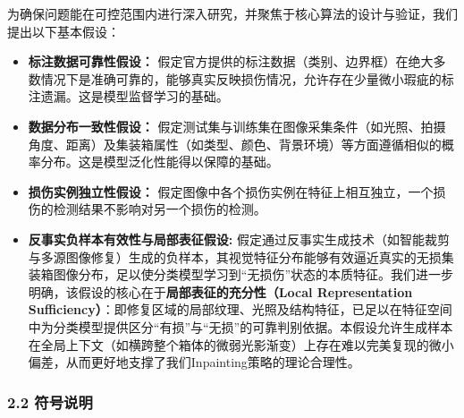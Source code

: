 \documentclass[
]{article}
\begin{document}
为确保问题能在可控范围内进行深入研究，并聚焦于核心算法的设计与验证，我们提出以下基本假设：

\begin{itemize}
\item
  \textbf{标注数据可靠性假设：}
  假定官方提供的标注数据（类别、边界框）在绝大多数情况下是准确可靠的，能够真实反映损伤情况，允许存在少量微小瑕疵的标注遗漏。这是模型监督学习的基础。
\item
  \textbf{数据分布一致性假设：}
  假定测试集与训练集在图像采集条件（如光照、拍摄角度、距离）及集装箱属性（如类型、颜色、背景环境）等方面遵循相似的概率分布。这是模型泛化性能得以保障的基础。
\item
  \textbf{损伤实例独立性假设：}
  假定图像中各个损伤实例在特征上相互独立，一个损伤的检测结果不影响对另一个损伤的检测。
\item
  \textbf{反事实负样本有效性与局部表征假设:}
  假定通过反事实生成技术（如智能裁剪与多源图像修复）生成的负样本，其视觉特征分布能够有效逼近真实的无损集装箱图像分布，足以使分类模型学习到``无损伤''状态的本质特征。我们进一步明确，该假设的核心在于\textbf{局部表征的充分性（Local
  Representation
  Sufficiency）}：即修复区域的局部纹理、光照及结构特征，已足以在特征空间中为分类模型提供区分``有损''与``无损''的可靠判别依据。本假设允许生成样本在全局上下文（如横跨整个箱体的微弱光影渐变）上存在难以完美复现的微小偏差，从而更好地支撑了我们Inpainting策略的理论合理性。
\end{itemize}

\subsubsection{2.2 符号说明}\label{22-ux7b26ux53f7ux8bf4ux660e}
\end{document}
